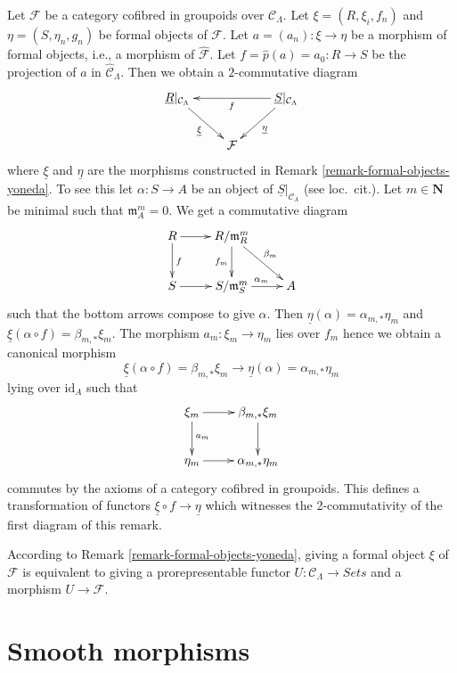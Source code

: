 \begin{remark}
\label{remark-formal-objects-yoneda-map}
Let $\mathcal{F}$ be a category cofibred in groupoids over
$\mathcal{C}_\Lambda$. Let $\xi = (R, \xi_i, f_n)$ and
$\eta = (S, \eta_n, g_n)$ be formal objects of $\mathcal{F}$.
Let $a = (a_n) : \xi \to \eta$ be a morphism of formal objects, i.e.,
a morphism of $\widehat{\mathcal{F}}$. Let
$f = \widehat{p}(a) = a_0 : R \to S$ be the projection of $a$ in
$\widehat{\mathcal{C}}_\Lambda$. Then we obtain a $2$-commutative
diagram
$$
\xymatrix{
\underline{R}|_{\mathcal{C}_\Lambda} \ar[rd]_{\underline{\xi}} & &
\underline{S}|_{\mathcal{C}_\Lambda} \ar[ll]^f \ar[ld]^{\underline{\eta}} \\
& \mathcal{F}
}
$$
where $\underline{\xi}$ and $\underline{\eta}$ are the morphisms
constructed in
Remark \ref{remark-formal-objects-yoneda}.
To see this let $\alpha : S \to A$ be an object of
$\underline{S}|_{\mathcal{C}_\Lambda}$ (see loc.\ cit.).
Let $m \in \mathbf{N}$ be minimal such that $\mathfrak m_A^m = 0$.
We get a commutative diagram
$$
\xymatrix{
R \ar[d]^f \ar[r] & R/\mathfrak m_R^m \ar[d]_{f_m} \ar[rd]^{\beta_m} \\
S \ar[r] & S/\mathfrak m_S^m \ar[r]^{\alpha_m} & A
}
$$
such that the bottom arrows compose to give $\alpha$.
Then $\underline{\eta}(\alpha) = \alpha_{m, *}\eta_m$ and
$\underline{\xi}(\alpha \circ f) = \beta_{m, *}\xi_m$. The morphism
$a_m : \xi_m \to \eta_m$ lies over $f_m$ hence we obtain a canonical
morphism
$$
\underline{\xi}(\alpha \circ f) = \beta_{m, *}\xi_m
\longrightarrow
\underline{\eta}(\alpha) = \alpha_{m, *}\eta_m
$$
lying over $\text{id}_A$ such that
$$
\xymatrix{
\xi_m \ar[r] \ar[d]^{a_m} &  \beta_{m, *}\xi_m \ar[d] \\
\eta_m \ar[r] &  \alpha_{m, *}\eta_m
}
$$
commutes by the axioms of a category cofibred in groupoids. This defines
a transformation of functors $\underline{\xi} \circ f \to \underline{\eta}$
which witnesses the 2-commutativity of the first diagram of this remark.
\end{remark}

\begin{remark}
\label{remark-spell-out-formal-object}
According to Remark \ref{remark-formal-objects-yoneda}, giving a formal object
$\xi$ of $\mathcal{F}$ is equivalent to giving a prorepresentable functor
$U : \mathcal{C}_\Lambda \to \textit{Sets}$ and a morphism
$U \to \mathcal{F}$.
\end{remark}




\section{Smooth morphisms}
\label{section-smooth-morphisms}

